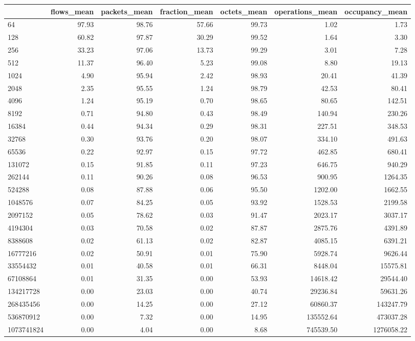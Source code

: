 \begin{tabular}{lrrrrrr}
\toprule
 & flows_mean & packets_mean & fraction_mean & octets_mean & operations_mean & occupancy_mean \\
\midrule
64 & 97.93 & 98.76 & 57.66 & 99.73 & 1.02 & 1.73 \\
128 & 60.82 & 97.87 & 30.29 & 99.52 & 1.64 & 3.30 \\
256 & 33.23 & 97.06 & 13.73 & 99.29 & 3.01 & 7.28 \\
512 & 11.37 & 96.40 & 5.23 & 99.08 & 8.80 & 19.13 \\
1024 & 4.90 & 95.94 & 2.42 & 98.93 & 20.41 & 41.39 \\
2048 & 2.35 & 95.55 & 1.24 & 98.79 & 42.53 & 80.41 \\
4096 & 1.24 & 95.19 & 0.70 & 98.65 & 80.65 & 142.51 \\
8192 & 0.71 & 94.80 & 0.43 & 98.49 & 140.94 & 230.26 \\
16384 & 0.44 & 94.34 & 0.29 & 98.31 & 227.51 & 348.53 \\
32768 & 0.30 & 93.76 & 0.20 & 98.07 & 334.10 & 491.63 \\
65536 & 0.22 & 92.97 & 0.15 & 97.72 & 462.85 & 680.41 \\
131072 & 0.15 & 91.85 & 0.11 & 97.23 & 646.75 & 940.29 \\
262144 & 0.11 & 90.26 & 0.08 & 96.53 & 900.95 & 1264.35 \\
524288 & 0.08 & 87.88 & 0.06 & 95.50 & 1202.00 & 1662.55 \\
1048576 & 0.07 & 84.25 & 0.05 & 93.92 & 1528.53 & 2199.58 \\
2097152 & 0.05 & 78.62 & 0.03 & 91.47 & 2023.17 & 3037.17 \\
4194304 & 0.03 & 70.58 & 0.02 & 87.87 & 2875.76 & 4391.89 \\
8388608 & 0.02 & 61.13 & 0.02 & 82.87 & 4085.15 & 6391.21 \\
16777216 & 0.02 & 50.91 & 0.01 & 75.90 & 5928.74 & 9626.44 \\
33554432 & 0.01 & 40.58 & 0.01 & 66.31 & 8448.04 & 15575.81 \\
67108864 & 0.01 & 31.35 & 0.00 & 53.93 & 14618.42 & 29544.40 \\
134217728 & 0.00 & 23.03 & 0.00 & 40.74 & 29236.84 & 59631.26 \\
268435456 & 0.00 & 14.25 & 0.00 & 27.12 & 60860.37 & 143247.79 \\
536870912 & 0.00 & 7.32 & 0.00 & 14.95 & 135552.64 & 473037.28 \\
1073741824 & 0.00 & 4.04 & 0.00 & 8.68 & 745539.50 & 1276058.22 \\
\bottomrule
\end{tabular}
